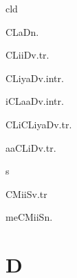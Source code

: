 \begin{multicols*}{2}
\begin{dictroot}{cl}{d}
    \begin{dictentry}{CLaD}{n.}
    \end{dictentry}
    \begin{dictentry}{CLiiD}{v.tr.}
    \end{dictentry}
    \begin{dictentry}{CLiyaD}{v.intr.}
    \end{dictentry}
    \begin{dictentry}{iCLaaD}{v.intr.}
    \end{dictentry}
    \begin{dictentry}{CLiCLiyaD}{v.tr.}
    \end{dictentry}
    \begin{dictentry}{aaCLiD}{v.tr.}
    \end{dictentry}
\end{dictroot}

\begin{dictroot}{cm}{s}
    \begin{dictentry}{CMiiS}{v.tr}
    \end{dictentry}
    \begin{dictentry}{meCMiiS}{n.}
    \end{dictentry}
\end{dictroot}

\section*{D}


\end{multicols*}
